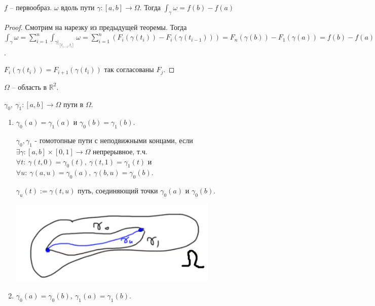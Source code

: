 \begin{consequence}
    $f$ -- первообраз. $\omega$ вдоль пути $\gamma: [a, b] \rightarrow \Omega$. Тогда $\int_{\gamma} {\omega} = f(b) - f(a)$
\end{consequence}
\begin{proof}
    Смотрим на нарезку из предыдущей теоремы. Тогда $\int_{\gamma} {\omega} = \sum_{i=1}^{n} { \int_{\gamma|_{[t_{i - 1}, t_i]}} {\omega}} = \sum_{i=1}^{n} { \left( F_i(\gamma(t_i)) - F_{i}(\gamma(t_{i - 1})) \right) } = F_n(\gamma(b)) - F_1(\gamma(a)) = f(b) - f(a)$.

    $F_i(\gamma(t_i)) = F_{i + 1} (\gamma(t_i))$ так согласованы $F_j$.
\end{proof}

\begin{definition}
    $\Omega$ -- область в $\mathbb{R}^2$.

    $\gamma_0, \ \gamma_1: [a, b] \rightarrow \Omega$ пути в $\Omega$.

    \begin{enumerate}
        \item {
            $\gamma_0(a) = \gamma_1(a)$ и $\gamma_0(b) = \gamma_1(b)$.

            $\gamma_0, \gamma_1$ - гомотопные пути с неподвижными концами, если $\exists \gamma: [a, b] \times [0, 1] \rightarrow \Omega$ непрерывное, т.ч. $\forall t: \ \gamma(t, 0) = \gamma_0(t), \ \gamma(t, 1) = \gamma_1(t)$ и $\forall u: \ \gamma(a, u) = \gamma_0(a), \ \gamma(b, u) = \gamma_0(b)$.
            
            $\gamma_u (t) := \gamma(t, u)$ путь, соединяющий точки $\gamma_0(a)$ и $\gamma_0(b)$.

            \begin{center}
                \includegraphics[width=10cm]{assets/03-intergrals-with-params/difinition-picture-2.png}
            \end{center}
        }
        \item {
            $\gamma_0(a) = \gamma_0(b), \ \gamma_1(a) = \gamma_1(b)$.

}
\end{enumerate}
\end{definition}
